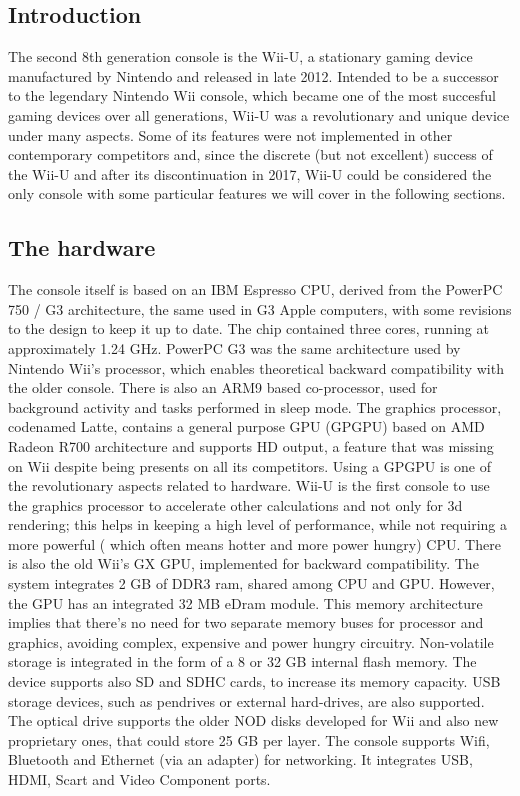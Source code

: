 \documentclass[a4paper,10pt]{book}
\begin{document}
 \subsection{ Introduction }
  The second 8th generation console is the Wii-U, a stationary gaming device manufactured by Nintendo and released in late 2012. Intended to be a successor to the legendary Nintendo Wii console, which became one of the most succesful gaming devices over all generations, Wii-U was a revolutionary and unique device under many aspects. Some of its features were not implemented in other contemporary competitors and, since the discrete (but not excellent) success of the Wii-U and after its discontinuation in 2017, Wii-U could be considered the only console with some particular features we will cover in the following sections. 
 \subsection{ The hardware  }
  The console itself is based on an IBM Espresso CPU, derived from the PowerPC 750 / G3 architecture, the same used in G3 Apple computers, with some revisions to the design to keep it up to date. The chip contained three cores, running at approximately 1.24 GHz. PowerPC G3 was the same architecture used by Nintendo Wii's processor, which enables theoretical backward compatibility with the older console. There is also an ARM9 based co-processor, used for background activity and tasks performed in sleep mode.  
  The graphics processor, codenamed Latte, contains a general purpose GPU (GPGPU) based on AMD Radeon R700 architecture and supports HD output, a feature that was missing on Wii despite being presents on all its competitors. Using a GPGPU is one of the revolutionary aspects related to hardware. Wii-U is the first console to use the graphics processor to accelerate other calculations and not only for 3d rendering; this helps in keeping a high level of performance, while not requiring a more powerful ( which often means hotter and more power hungry) CPU. There is also the old Wii's GX GPU, implemented for backward compatibility.  
  The system integrates 2 GB of DDR3 ram, shared among CPU and GPU. However, the GPU has an integrated 32 MB eDram module. This memory architecture implies that there's no need for two separate memory buses for processor and graphics, avoiding complex, expensive and power hungry circuitry.  
  Non-volatile storage is integrated in the form of a 8 or 32 GB internal flash memory. The device supports also SD and SDHC cards, to increase its memory capacity. USB storage devices, such as pendrives or external hard-drives, are also supported. The optical drive supports the older NOD disks developed for Wii and also new proprietary ones, that could store 25 GB per layer.  
  The console supports Wifi, Bluetooth and Ethernet (via an adapter) for networking. It integrates USB, HDMI, Scart and Video Component ports.  
\end{document}
